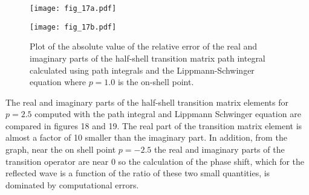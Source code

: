\documentclass[aps,prc,reprint,noshowpacs,groupedaddress,onecolumn]{revtex4}
\begin{document}
\begin{figure}
\caption{Plot of the absolute value of the relative error
of the real and imaginary parts of the half-shell transition matrix
path integral calculated using path integrals and
the Lippmann-Schwinger equation where $p=1.0$  is the on-shell point.
} 
\begin{minipage}[t]{.45\linewidth}  
\centering
\texttt{[image: fig\_17a.pdf]}
\end{minipage}
\begin{minipage}[t]{.45\linewidth}  
\centering
\texttt{[image: fig\_17b.pdf]}
\end{minipage}
\label{figure 17}
\end{figure}  
The real and imaginary parts of the half-shell transition matrix
elements for $p=2.5$ computed with the path integral and Lippmann
Schwinger equation are compared in figures 18 and 19.  The real part
of the transition matrix element is almost a factor of 10
smaller than the imaginary part.  In addition, from the
graph, near the on shell point $p=-2.5$ the real and imaginary parts
of the transition operator are near 0 so the calculation of the phase
shift, which for the reflected wave is a function of the ratio of
these two small quantities, is dominated by computational errors.
\end{document}
